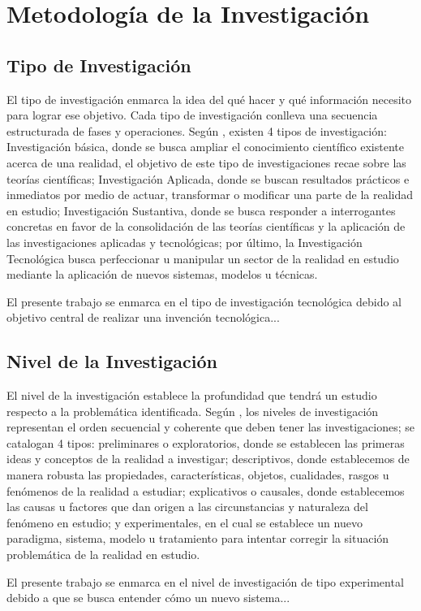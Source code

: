 \chapter{Metodología de la Investigación}
\section{Tipo de Investigación}
    \begin{sectext}

        El tipo de investigación enmarca la idea del qué hacer y qué información necesito para lograr ese objetivo. Cada tipo de investigación conlleva una secuencia estructurada de fases y operaciones. Según \textcite{carrasco_dias_metodologia_2005}, existen 4 tipos de investigación: Investigación básica, donde se busca ampliar el conocimiento científico existente acerca de una realidad, el objetivo de este tipo de investigaciones recae sobre las teorías científicas; Investigación Aplicada, donde se buscan resultados prácticos e inmediatos por medio de actuar, transformar o modificar una parte de la realidad en estudio; Investigación Sustantiva, donde se busca responder a interrogantes concretas en favor de la consolidación de las teorías científicas y la aplicación de las investigaciones aplicadas y tecnológicas; por último, la Investigación Tecnológica busca perfeccionar u manipular un sector de la realidad en estudio mediante la aplicación de nuevos sistemas, modelos u técnicas.
        
        El presente trabajo se enmarca en el tipo de investigación tecnológica debido al objetivo central de realizar una invención tecnológica...
    \end{sectext}

\section{Nivel de la Investigación}
    \begin{sectext}
        El nivel de la investigación establece la profundidad que tendrá un estudio respecto a la problemática identificada. Según \textcite{carrasco_dias_metodologia_2005}, los niveles de investigación representan el orden secuencial y coherente que deben tener las investigaciones; se catalogan 4 tipos: preliminares o exploratorios, donde se establecen las primeras ideas y conceptos de la realidad a investigar; descriptivos, donde establecemos de manera robusta las propiedades, características, objetos, cualidades, rasgos u fenómenos de la realidad a estudiar; explicativos o causales, donde establecemos las causas u factores que dan origen a las circunstancias y naturaleza del fenómeno en estudio; y experimentales, en el cual se establece un nuevo paradigma, sistema, modelo u tratamiento para intentar corregir la situación problemática de la realidad en estudio.
        
        El presente trabajo se enmarca en el nivel de investigación de tipo experimental debido a que se busca entender cómo un nuevo sistema...
    \end{sectext}